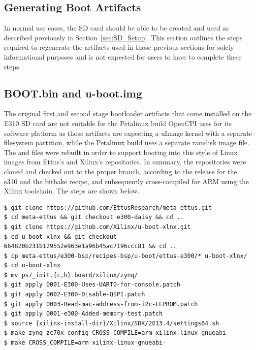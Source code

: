 \begin{appendices}
\section{Generating Boot Artifacts}
\label{app:sd_card}
In normal use cases, the SD card should be able to be created and used as described previously in Section~\ref{sec:SD_Setup}. This section outlines the steps required to regenerate the artifacts used in those previous sections for solely informational purposes and is not expected for users to have to complete these steps.
\subsection{BOOT.bin and u-boot.img}
The original first and second stage bootloader artifacts that come installed on the E310 SD card are not suitable for the Petalinux build OpenCPI uses for its software platform as those artifacts are expecting a uImage kernel with a separate filesystem partition, while the Petalinux build uses a separate ramdisk image file. The  and  files were rebuilt in order to support booting into this style of Linux images from Ettus's and Xilinx's repositories. In summary, the repositories were cloned and checked out to the proper branch, according to the release for the e310 and the bitbake recipe, and subsequently cross-compiled for ARM using the Xilinx toolchain. The steps are shown below.
\begin{lstlisting}[showspaces=false]
$ git clone https://github.com/EttusResearch/meta-ettus.git
$ cd meta-ettus && git checkout e300-daisy && cd ..
$ git clone https://github.com/Xilinx/u-boot-xlnx.git
$ cd u-boot-xlnx && git checkout 664820b231b129552e963e1a96b45ac7196ccc81 && cd ..
$ cp meta-ettus/e300-bsp/recipes-bsp/u-boot/ettus-e300/* u-boot-xlnx/
$ cd u-boot-xlnx
$ mv ps7_init.{c,h} board/xilinx/zynq/
$ git apply 0001-E300-Uses-UART0-for-console.patch
$ git apply 0002-E300-Disable-QSPI.patch
$ git apply 0003-Read-mac-address-from-i2c-EEPROM.patch
$ git apply 0001-e300-Added-memory-test.patch
$ source {xilinx-install-dir}/Xilinx/SDK/2013.4/settings64.sh
$ make zynq_zc70x_config CROSS_COMPILE=arm-xilinx-linux-gnueabi-
$ make CROSS_COMPILE=arm-xilinx-linux-gnueabi-
\end{lstlisting}

\end{appendices}
